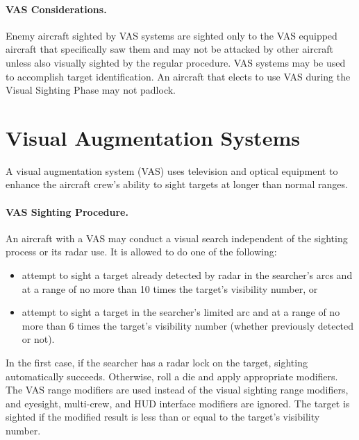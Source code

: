 \begin{advancedrules}
{\paragraph{VAS Considerations.} Enemy aircraft sighted by VAS systems are sighted only to the VAS equipped aircraft that specifically saw them and may not be attacked by other aircraft unless also visually sighted by the regular procedure. VAS systems may be used to accomplish target identification. An aircraft that elects to use VAS during the Visual Sighting Phase may not padlock.

}{

\section{Visual Augmentation Systems}
\label{rule:vas}

A visual augmentation system (VAS) uses television and optical equipment to enhance the aircraft crew’s ability to sight targets at longer than normal ranges.


\paragraph{VAS Sighting Procedure.} An aircraft with a VAS may conduct a visual search independent of the sighting process or its radar use. It is allowed to do one of the following:

\begin{itemize}

    \item attempt to sight a target already detected by radar in the searcher’s   arcs and at a range of no more than 10 times the target’s visibility number, or

    \item attempt to sight a target in the searcher’s limited  arc and at a range of no more than 6 times the target’s visibility number (whether previously detected or not).

\end{itemize}

In the first case, if the searcher has a radar lock on the target, sighting automatically succeeds. Otherwise, roll a die and apply appropriate modifiers. The VAS range modifiers are used instead of the visual sighting range modifiers, and eyesight, multi-crew, and HUD interface modifiers are ignored. The target is sighted if the modified result is less than or equal to the target’s visibility number.

}
\end{advancedrules}
